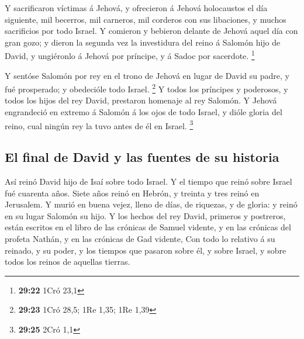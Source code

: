  Y sacrificaron víctimas á Jehová, y ofrecieron á Jehová
holocaustos el día siguiente, mil becerros, mil carneros, mil corderos
con sus libaciones, y muchos sacrificios por todo Israel. 
Y comieron y bebieron delante de Jehová aquel día con gran gozo; y
dieron la segunda vez la investidura del reino á Salomón hijo de David,
y ungiéronlo á Jehová por príncipe, y á Sadoc por sacerdote. \footnote{\textbf{29:22}
  1Cró 23,1}

 Y sentóse Salomón por rey en el trono de Jehová en lugar
de David su padre, y fué prosperado; y obedecióle todo Israel.
\footnote{\textbf{29:23} 1Cró 28,5; 1Re 1,35; 1Re 1,39}  Y
todos los príncipes y poderosos, y todos los hijos del rey David,
prestaron homenaje al rey Salomón.  Y Jehová engrandeció en
extremo á Salomón á los ojos de todo Israel, y dióle gloria del reino,
cual ningún rey la tuvo antes de él en Israel. \footnote{\textbf{29:25}
  2Cró 1,1}

\hypertarget{el-final-de-david-y-las-fuentes-de-su-historia}{%
\subsection{El final de David y las fuentes de su
historia}\label{el-final-de-david-y-las-fuentes-de-su-historia}}

 Así reinó David hijo de Isaí sobre todo Israel.
 Y el tiempo que reinó sobre Israel fué cuarenta años.
Siete años reinó en Hebrón, y treinta y tres reinó en Jerusalem.
 Y murió en buena vejez, lleno de días, de riquezas, y de
gloria: y reinó en su lugar Salomón su hijo.  Y los hechos
del rey David, primeros y postreros, están escritos en el libro de las
crónicas de Samuel vidente, y en las crónicas del profeta Nathán, y en
las crónicas de Gad vidente,  Con todo lo relativo á su
reinado, y su poder, y los tiempos que pasaron sobre él, y sobre Israel,
y sobre todos los reinos de aquellas tierras.
